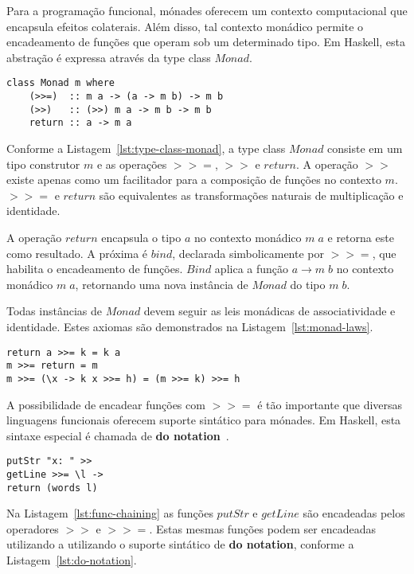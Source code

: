 \documentclass[10pt, conference]{IEEEtran}
\begin{document}
Para a programação funcional, mónades oferecem um contexto computacional que encapsula efeitos colaterais. Além disso, tal contexto monádico permite o encadeamento de funções que operam sob um determinado tipo. Em Haskell, esta abstração é expressa através da type class $Monad$.

\begin{lstlisting}[caption={Type class Monad~\cite{marlow2010haskell}}, label={lst:type-class-monad}]
class Monad m where
	(>>=)  :: m a -> (a -> m b) -> m b
	(>>)   :: (>>) m a -> m b -> m b
	return :: a -> m a
\end{lstlisting}

Conforme a Listagem~\ref{lst:type-class-monad}, a type class $Monad$ consiste em um tipo construtor $m$ e as operações $>>=$, $>>$ e $return$. A operação $>>$ existe apenas como um facilitador para a composição de funções no contexto $m$. $>>=$ e $return$ são equivalentes as transformações naturais de multiplicação e identidade.

A operação $return$ encapsula o tipo $a$ no contexto monádico $m\;a$ e retorna este como resultado. A próxima é $bind$, declarada simbolicamente por $>>=$, que habilita o encadeamento de funções. $Bind$ aplica a função $a \rightarrow m\;b$ no contexto monádico $m\;a$, retornando uma nova instância de $Monad$ do tipo $m\;b$.

Todas instâncias de $Monad$ devem seguir as leis monádicas de associatividade e identidade. Estes axiomas são demonstrados na Listagem~\ref{lst:monad-laws}.

\begin{lstlisting}[caption={Leis para $Monad$~\cite{marlow2010haskell}}, label={lst:monad-laws}]
return a >>= k = k a
m >>= return = m
m >>= (\x -> k x >>= h) = (m >>= k) >>= h
\end{lstlisting}

A possibilidade de encadear funções com $>>=$ é tão importante que diversas linguagens funcionais oferecem suporte sintático para mónades. Em Haskell, esta sintaxe especial é chamada de \textbf{do notation}~\cite{marlow2010haskell}.

\begin{lstlisting}[caption={Encadeando Funções com Bind e Then~\cite{marlow2010haskell}}, label={lst:func-chaining}]
putStr "x: " >>
getLine >>= \l -> 
return (words l)
\end{lstlisting}

Na Listagem~\ref{lst:func-chaining} as funções $putStr$ e $getLine$ são encadeadas pelos operadores $>>$ e $>>=$. Estas mesmas funções podem ser encadeadas utilizando a utilizando o suporte sintático de \textbf{do notation}, conforme a Listagem~\ref{lst:do-notation}.
\end{document}
